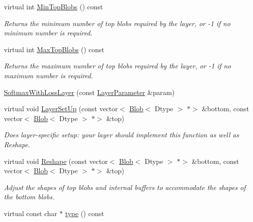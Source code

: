 \begin{DoxyCompactItemize}
virtual int \mbox{\hyperlink{classcaffe_1_1_softmax_with_loss_layer_a9969336702fb1bbf31750629fb38fb45}{Min\+Top\+Blobs}} () const
\begin{DoxyCompactList}\small\item\em Returns the minimum number of top blobs required by the layer, or -\/1 if no minimum number is required. \end{DoxyCompactList}\item 
virtual int \mbox{\hyperlink{classcaffe_1_1_softmax_with_loss_layer_a5a0b4c02fe76ae9087cd8b1b9edd9910}{Max\+Top\+Blobs}} () const
\begin{DoxyCompactList}\small\item\em Returns the maximum number of top blobs required by the layer, or -\/1 if no maximum number is required. \end{DoxyCompactList}\item 
\mbox{\hyperlink{classcaffe_1_1_softmax_with_loss_layer_ac3a01d6846a9b62c1790635d53185e81}{Softmax\+With\+Loss\+Layer}} (const \mbox{\hyperlink{classcaffe_1_1_layer_parameter}{Layer\+Parameter}} \&param)
\item 
virtual void \mbox{\hyperlink{classcaffe_1_1_softmax_with_loss_layer_a2a3985570178431a4cc3f9b9fd4378c2}{Layer\+Set\+Up}} (const vector$<$ \mbox{\hyperlink{classcaffe_1_1_blob}{Blob}}$<$ Dtype $>$ $\ast$$>$ \&bottom, const vector$<$ \mbox{\hyperlink{classcaffe_1_1_blob}{Blob}}$<$ Dtype $>$ $\ast$$>$ \&top)
\begin{DoxyCompactList}\small\item\em Does layer-\/specific setup\+: your layer should implement this function as well as Reshape. \end{DoxyCompactList}\item 
virtual void \mbox{\hyperlink{classcaffe_1_1_softmax_with_loss_layer_ad8f5d429254deaebe4ea5f14bfa0d4d0}{Reshape}} (const vector$<$ \mbox{\hyperlink{classcaffe_1_1_blob}{Blob}}$<$ Dtype $>$ $\ast$$>$ \&bottom, const vector$<$ \mbox{\hyperlink{classcaffe_1_1_blob}{Blob}}$<$ Dtype $>$ $\ast$$>$ \&top)
\begin{DoxyCompactList}\small\item\em Adjust the shapes of top blobs and internal buffers to accommodate the shapes of the bottom blobs. \end{DoxyCompactList}\item 
\mbox{\label{classcaffe_1_1_softmax_with_loss_layer_a79aad991f6c56097068ccca031f1288a}} 
virtual const char $\ast$ \mbox{\hyperlink{classcaffe_1_1_softmax_with_loss_layer_a79aad991f6c56097068ccca031f1288a}{type}} () const

\end{DoxyCompactItemize}
